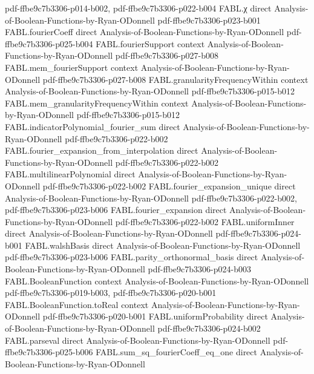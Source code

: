 \begin{theorem}
  {pdf-ffbe9c7b3306-p014-b002,
    pdf-ffbe9c7b3306-p022-b004}
\proofstep
  {FABL.χ}
  {direct}
  {Analysis-of-Boolean-Functions-by-Ryan-ODonnell}
  {pdf-ffbe9c7b3306-p023-b001}
\proofstep
  {FABL.fourierCoeff}
  {direct}
  {Analysis-of-Boolean-Functions-by-Ryan-ODonnell}
  {pdf-ffbe9c7b3306-p025-b004}
\proofstep
  {FABL.fourierSupport}
  {context}
  {Analysis-of-Boolean-Functions-by-Ryan-ODonnell}
  {pdf-ffbe9c7b3306-p027-b008}
\proofstep
  {FABL.mem_fourierSupport}
  {context}
  {Analysis-of-Boolean-Functions-by-Ryan-ODonnell}
  {pdf-ffbe9c7b3306-p027-b008}
\proofstep
  {FABL.granularityFrequencyWithin}
  {context}
  {Analysis-of-Boolean-Functions-by-Ryan-ODonnell}
  {pdf-ffbe9c7b3306-p015-b012}
\proofstep
  {FABL.mem_granularityFrequencyWithin}
  {context}
  {Analysis-of-Boolean-Functions-by-Ryan-ODonnell}
  {pdf-ffbe9c7b3306-p015-b012}
\proofstep
  {FABL.indicatorPolynomial_fourier_sum}
  {direct}
  {Analysis-of-Boolean-Functions-by-Ryan-ODonnell}
  {pdf-ffbe9c7b3306-p022-b002}
\proofstep
  {FABL.fourier_expansion_from_interpolation}
  {direct}
  {Analysis-of-Boolean-Functions-by-Ryan-ODonnell}
  {pdf-ffbe9c7b3306-p022-b002}
\proofstep
  {FABL.multilinearPolynomial}
  {direct}
  {Analysis-of-Boolean-Functions-by-Ryan-ODonnell}
  {pdf-ffbe9c7b3306-p022-b002}
\proofstep
  {FABL.fourier_expansion_unique}
  {direct}
  {Analysis-of-Boolean-Functions-by-Ryan-ODonnell}
  {pdf-ffbe9c7b3306-p022-b002,
    pdf-ffbe9c7b3306-p023-b006}
\proofstep
  {FABL.fourier_expansion}
  {direct}
  {Analysis-of-Boolean-Functions-by-Ryan-ODonnell}
  {pdf-ffbe9c7b3306-p022-b002}
\proofstep
  {FABL.uniformInner}
  {direct}
  {Analysis-of-Boolean-Functions-by-Ryan-ODonnell}
  {pdf-ffbe9c7b3306-p024-b001}
\proofstep
  {FABL.walshBasis}
  {direct}
  {Analysis-of-Boolean-Functions-by-Ryan-ODonnell}
  {pdf-ffbe9c7b3306-p023-b006}
\proofstep
  {FABL.parity_orthonormal_basis}
  {direct}
  {Analysis-of-Boolean-Functions-by-Ryan-ODonnell}
  {pdf-ffbe9c7b3306-p024-b003}
\proofstep
  {FABL.BooleanFunction}
  {context}
  {Analysis-of-Boolean-Functions-by-Ryan-ODonnell}
  {pdf-ffbe9c7b3306-p019-b003,
    pdf-ffbe9c7b3306-p020-b001}
\proofstep
  {FABL.BooleanFunction.toReal}
  {context}
  {Analysis-of-Boolean-Functions-by-Ryan-ODonnell}
  {pdf-ffbe9c7b3306-p020-b001}
\proofstep
  {FABL.uniformProbability}
  {direct}
  {Analysis-of-Boolean-Functions-by-Ryan-ODonnell}
  {pdf-ffbe9c7b3306-p024-b002}
\proofstep
  {FABL.parseval}
  {direct}
  {Analysis-of-Boolean-Functions-by-Ryan-ODonnell}
  {pdf-ffbe9c7b3306-p025-b006}
\proofstep
  {FABL.sum_sq_fourierCoeff_eq_one}
  {direct}
  {Analysis-of-Boolean-Functions-by-Ryan-ODonnell}

\end{theorem}
